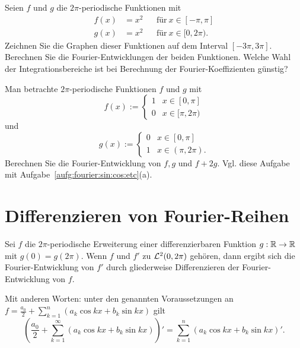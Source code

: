 \begin{aufg} 
	Seien $f $ und $g$ die $2\pi$-periodische Funktionen mit 
	\begin{align*}
			f(x) & = x^2 & & \text{für} \ x \in [-\pi,\pi]
			\\ g(x) & = x^2 & & \text{für} \ x \in [0,2 \pi). 
	\end{align*} 	
Zeichnen Sie die Graphen dieser Funktionen auf dem Interval $[-3\pi,3\pi]$. Berechnen Sie die Fourier-Entwicklungen der beiden Funktionen. Welche Wahl der Integrationsbereiche ist bei Berechnung der Fourier-Koeffizienten günstig? 
\end{aufg} 

\begin{aufg}
	Man betrachte $2\pi$-periodische Funktionen $f$ und $g$ mit 
	\[
			f(x):= 
			\begin{cases}
				1 & x \in [0,\pi]
				\\ 0 & x \in [\pi,2\pi) 
			\end{cases} 
	\]
	und 
	\[
			g(x) := 
			\begin{cases}
					0 & x \in [0,\pi]
					\\1 & x \in (\pi,2\pi).  
			\end{cases} 
	\]
	Berechnen Sie die Fourier-Entwicklung von $f, g$ und $f + 2 g$. Vgl. diese Aufgabe mit  Aufgabe~\ref{aufg:fourier:sin:cos:etc}(a). 
\end{aufg} 

\section{Differenzieren von Fourier-Reihen} 

	\begin{thm} \label{thm:diff:f:reihe} 
		Sei $f$ die $2\pi$-periodische Erweiterung einer differenzierbaren Funktion $g : \mathbb{R} \to \mathbb{R}$ mit $g(0) = g(2\pi)$. Wenn $f$ und $f'$ zu $\mathcal{L}^2(0,2\pi)$ gehören, dann ergibt sich die Fourier-Entwicklung von $f'$ durch gliederweise Differenzieren der Fourier-Entwicklung von $f$. 
		
		Mit anderen Worten: unter den genannten Voraussetzungen an $ f = \frac{a_0}{2} + \sum_{k=1}^n (a_k \cos k x + b_k \sin k x)$ gilt 
		\[
				\left( \frac{a_0}{2} + \sum_{k=1}^\infty (a_k \cos k x + b_k \sin k x) \right)' = \sum_{k=1}^n (a_k \cos k x + b_k \sin k x)'. 
		\]
	\end{thm} 

